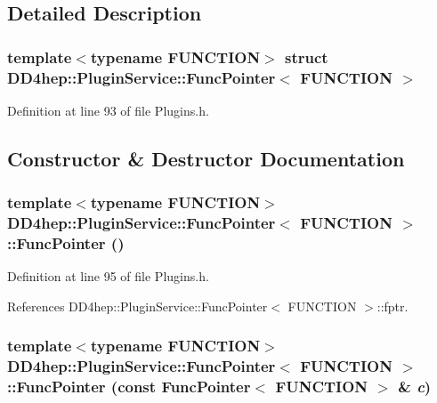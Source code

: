 \subsection{Detailed Description}
\subsubsection*{template$<$typename FUNCTION$>$ struct DD4hep::PluginService::FuncPointer$<$ FUNCTION $>$}



Definition at line 93 of file Plugins.h.

\subsection{Constructor \& Destructor Documentation}
\hypertarget{struct_d_d4hep_1_1_plugin_service_1_1_func_pointer_ae5956ad0aad6406a1e9f8132ec730814}{
\subsubsection[{FuncPointer}]{\setlength{\rightskip}{0pt plus 5cm}template$<$typename FUNCTION$>$ {\bf DD4hep::PluginService::FuncPointer}$<$ FUNCTION $>$::{\bf FuncPointer} ()}}
\label{struct_d_d4hep_1_1_plugin_service_1_1_func_pointer_ae5956ad0aad6406a1e9f8132ec730814}


Definition at line 95 of file Plugins.h.

References DD4hep::PluginService::FuncPointer$<$ FUNCTION $>$::fptr.\hypertarget{struct_d_d4hep_1_1_plugin_service_1_1_func_pointer_ae44e78b875229c095bbb81a40ddd2a30}{
\subsubsection[{FuncPointer}]{\setlength{\rightskip}{0pt plus 5cm}template$<$typename FUNCTION$>$ {\bf DD4hep::PluginService::FuncPointer}$<$ FUNCTION $>$::{\bf FuncPointer} (const {\bf FuncPointer}$<$ FUNCTION $>$ \& {\em c})}}
\label{struct_d_d4hep_1_1_plugin_service_1_1_func_pointer_ae44e78b875229c095bbb81a40ddd2a30}


